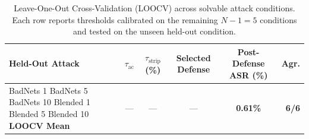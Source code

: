 \begin{table}[t]
\centering
\small
\caption{Leave-One-Out Cross-Validation (LOOCV) across solvable attack conditions. Each row reports thresholds calibrated on the remaining $N-1=5$ conditions and tested on the unseen held-out condition.}
\label{tab:loocv}
\begin{tabular}{lccccr}
\toprule
Held-Out Attack & $\tau_{\text{ac}}$ & $\tau_{\text{strip}}$ (\%) & Selected Defense & Post-Defense ASR (\%) & Agr. \\
\midrule
BadNets 1%
BadNets 5%
BadNets 10%
Blended 1%
Blended 5%
Blended 10%
\midrule
\textbf{LOOCV Mean} & --- & --- & --- & \textbf{0.61\%} & \textbf{6/6} \\
\bottomrule
\end{tabular}
\end{table}
